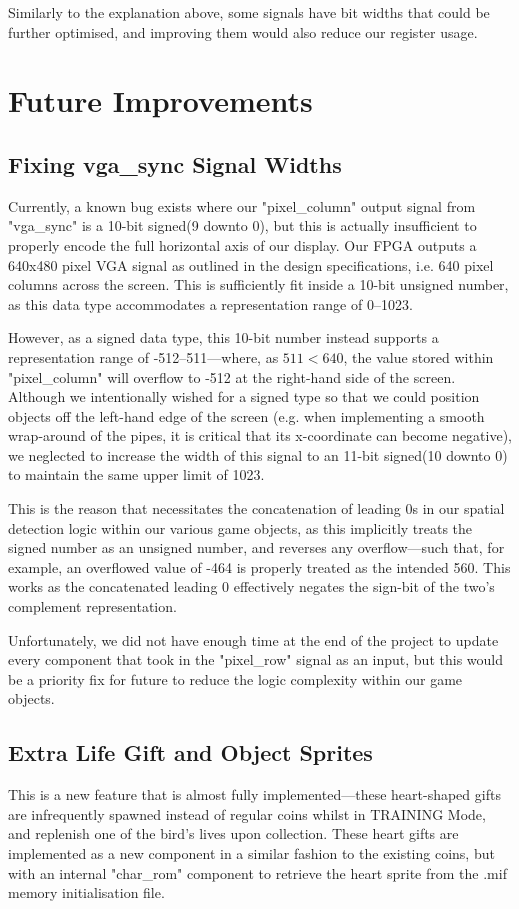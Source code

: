 \documentclass[conference]{IEEEtran}
\begin{document}
Similarly to the explanation above, some signals have bit widths that could be further optimised, and improving them would also reduce our register usage.

\section{Future Improvements}
\subsection{Fixing vga\_sync Signal Widths}
Currently, a known bug exists where our "pixel\_column" output signal from "vga\_sync" is a 10-bit signed(9 downto 0), but this is actually insufficient to properly encode the full horizontal axis of our display. Our FPGA outputs a 640x480 pixel VGA signal as outlined in the design specifications, i.e. 640 pixel columns across the screen. This is sufficiently fit inside a 10-bit unsigned number, as this data type accommodates a representation range of 0–1023.

However, as a signed data type, this 10-bit number instead supports a representation range of -512–511—where, as $511<640$, the value stored within "pixel\_column" will overflow to -512 at the right-hand side of the screen. Although we intentionally wished for a signed type so that we could position objects off the left-hand edge of the screen (e.g. when implementing a smooth wrap-around of the pipes, it is critical that its x-coordinate can become negative), we neglected to increase the width of this signal to an 11-bit signed(10 downto 0) to maintain the same upper limit of 1023.

This is the reason that necessitates the concatenation of leading 0s in our spatial detection logic within our various game objects, as this implicitly treats the signed number as an unsigned number, and reverses any overflow—such that, for example, an overflowed value of -464 is properly treated as the intended 560. This works as the concatenated leading 0 effectively negates the sign-bit of the two's complement representation.

Unfortunately, we did not have enough time at the end of the project to update every component that took in the "pixel\_row" signal as an input, but this would be a priority fix for future to reduce the logic complexity within our game objects.

\subsection{Extra Life Gift and Object Sprites}
This is a new feature that is almost fully implemented—these heart-shaped gifts are infrequently spawned instead of regular coins whilst in TRAINING Mode, and replenish one of the bird's lives upon collection. These heart gifts are implemented as a new component in a similar fashion to the existing coins, but with an internal "char\_rom" component to retrieve the heart sprite from the .mif memory initialisation file.
\end{document}
